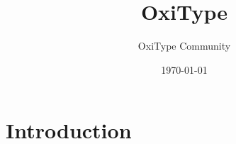 \documentclass[a4paper,oneside]{memoir}
\title{OxiType}
\author{OxiType Community}
\date{\today}
\begin{document}
    \maketitle\cleardoublepage
\tableofcontents
\chapter{Introduction}
\end{document}

